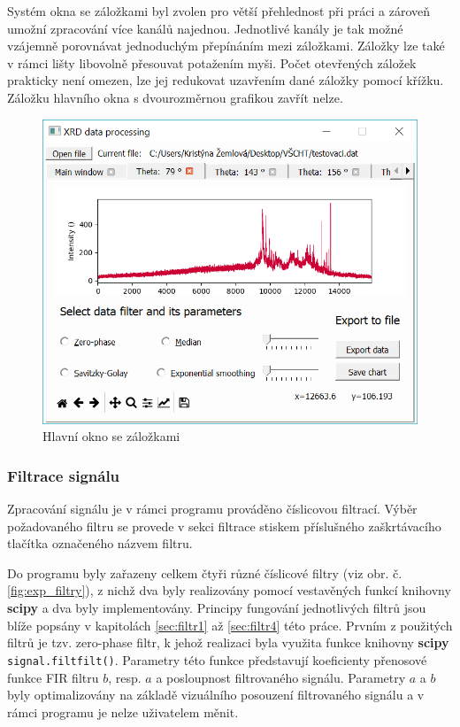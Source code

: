 \documentclass[a4paper, 12pt]{article}
\begin{document}
Systém okna se záložkami byl zvolen pro větší přehlednost při práci a zároveň umožní zpracování více kanálů najednou. Jednotlivé kanály je tak možné vzájemně porovnávat jednoduchým přepínáním mezi záložkami. Záložky lze také v rámci lišty libovolně přesouvat potažením myši. Počet otevřených záložek prakticky není omezen, lze jej redukovat uzavřením dané záložky pomocí křížku. Záložku hlavního okna s dvourozměrnou grafikou zavřít nelze.

\begin{figure}[hbt!]
    \centering
    \includegraphics[width=\linewidth]{gui_tab.png}
    \caption{Hlavní okno se záložkami}
    \label{fig:gui_tab}
\end{figure}

\subsubsection{Filtrace signálu}\label{sec:exp_filtrace}
Zpracování signálu je v rámci programu prováděno číslicovou filtrací. Výběr požadovaného filtru se provede v sekci filtrace stiskem příslušného zaškrtávacího tlačítka označeného názvem filtru.

\noindent Do programu byly zařazeny celkem čtyři různé číslicové filtry (viz obr. č. \ref{fig:exp_filtry}), z nichž dva byly realizovány pomocí vestavěných funkcí knihovny \textbf{scipy} a dva byly implementovány. Principy fungování jednotlivých filtrů jsou blíže popsány v kapitolách \ref{sec:filtr1} až \ref{sec:filtr4} této práce.
\vskip 0.1in
\noindent Prvním z použitých filtrů je tzv. zero-phase filtr, k jehož realizaci byla využita funkce knihovny \textbf{scipy} \texttt{signal.filtfilt()}. Parametry této funkce představují koeficienty přenosové funkce FIR filtru $b$, resp. $a$ a posloupnost filtrovaného signálu. Parametry $a$ a $b$ byly optimalizovány na základě vizuálního posouzení filtrovaného signálu a v rámci programu je nelze uživatelem měnit.
\end{document}
